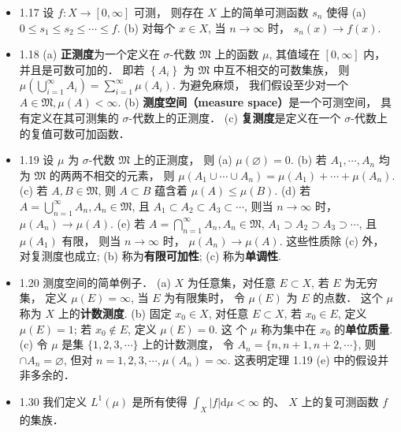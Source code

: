 \begin{itemize}
\item 1.17 设 $f:X \rightarrow[0, \infty]$ 可测， 则存在 $X$ 上的简单可测函数 $s_{n}$ 使得 (a) $0 \leqslant s_{1} \leqslant s_{2} \leqslant \cdots \leqslant f$. (b) 对每个 $x \in X$, 当 $n \rightarrow \infty$ 时， $s_{n}(x) \rightarrow f(x)$.

\item 1.18 (a) \textbf{正测度}为一个定义在 $\sigma$-代数 $\mathfrak{M}$ 上的函数 $\mu$, 其值域在 $[0, \infty]$ 内， 并且是可数可加的． 即若 $\left\{A_{i}\right\}$ 为 $\mathfrak{M}$ 中互不相交的可数集族， 则 $\mu\left(\bigcup_{i=1}^{\infty} A_{i}\right)=\sum_{i=1}^{\infty} \mu\left(A_{i}\right)$. 为避免麻烦， 我们假设至少对一个 $A \in \mathfrak{M}, \mu(A)<\infty$.
(b) \textbf{测度空间（measure space）}是一个可测空间， 具有定义在其可测集的 $\sigma$-代数上的正测度．
(c) \textbf{复测度}是定义在一个 $\sigma$-代数上的复值可数可加函数．

\item 1.19 设 $\mu$ 为 $\sigma$-代数 $\mathfrak{M}$ 上的正测度， 则
(a) $\mu(\varnothing)=0$.
(b) 若 $A_{1}, \cdots, A_{n}$ 均为 $\mathfrak{M}$ 的两两不相交的元素， 则
$\mu\left(A_{1} \cup \cdots \cup A_{n}\right)=\mu\left(A_{1}\right)+\cdots+\mu\left(A_{n}\right) .$
(c) 若 $A, B \in \mathfrak{M}$, 则 $A \subset B$ 蕴含着 $\mu(A) \leqslant \mu(B)$.
(d) 若 $A=\bigcup_{n=1}^{\infty} A_{n}, A_{n} \in \mathfrak{M}$, 且 $A_{1} \subset A_{2} \subset A_{3} \subset \cdots$, 则当 $n \rightarrow \infty$ 时， $\mu\left(A_{n}\right) \rightarrow \mu(A)$.
(e) 若 $A=\bigcap_{n=1}^{\infty} A_{n}, A_{n} \in \mathfrak{M}$, $A_{1} \supset A_{2} \supset A_{3} \supset \cdots$, 且 $\mu\left(A_{1}\right)$ 有限， 则当 $n \rightarrow \infty$ 时， $\mu\left(A_{n}\right) \rightarrow \mu(A)$.
这些性质除 (c) 外， 对复测度也成立; (b) 称为\textbf{有限可加性}; (c) 称为\textbf{单调性}.

\item 1.20 测度空间的简单例子．
(a) $X$ 为任意集，对任意 $E \subset X$, 若 $E$ 为无穷集， 定义 $\mu(E)=\infty$, 当 $E$ 为有限集时， 令 $\mu(E)$ 为 $E$ 的点数． 这个 $\mu$ 称为 $X$ 上的\textbf{计数测度}.
(b) 固定 $x_{0} \in X$, 对任意 $E \subset X$, 若 $x_{0} \in E$, 定义 $\mu(E)=1$; 若 $x_{0} \notin E$, 定义 $\mu(E)=0$. 这 个 $\mu$ 称为集中在 $x_{0}$ 的\textbf{单位质量}.
(c) 令 $\mu$ 是集 $\{1,2,3, \cdots\}$ 上的计数测度， 令 $A_{n}=\{n, n+1, n+2, \cdots\}$, 则 $\cap A_{n}=\varnothing$, 但对 $n=1,2,3, \cdots, \mu\left(A_{n}\right)=\infty$. 这表明定理 1.19 (e) 中的假设并非多余的．

\item 1.30 我们定义 $L^{1}(\mu)$ 是所有使得 $\int_{X}|f| \mathrm{d} \mu<\infty$ 的、 $X$ 上的复可测函数 $f$ 的集族．


\end{itemize}
